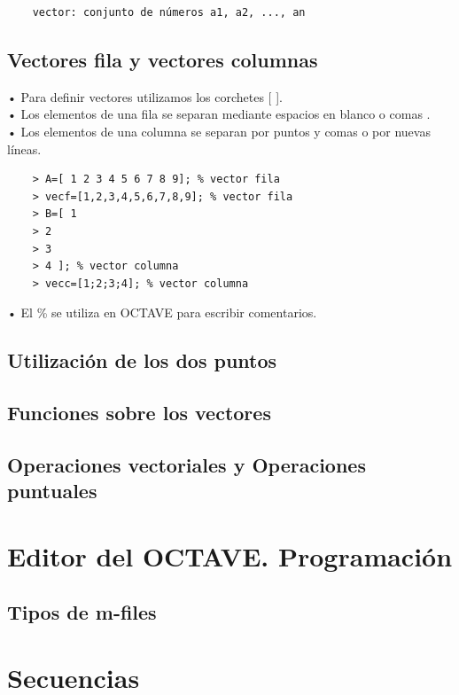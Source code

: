 \documentclass[a4,12pt]{article}
\begin{document}
\begin{verbatim}
    vector: conjunto de números a1, a2, ..., an
\end{verbatim}

\subsection{Vectores fila y vectores columnas}

• Para definir vectores utilizamos los corchetes [ ].\\
• Los elementos de una fila se separan mediante espacios en blanco o comas .\\
• Los elementos de una columna se separan por puntos y comas o por nuevas líneas.\\
\begin{verbatim}
    > A=[ 1 2 3 4 5 6 7 8 9]; % vector fila
    > vecf=[1,2,3,4,5,6,7,8,9]; % vector fila
    > B=[ 1
    > 2
    > 3
    > 4 ]; % vector columna
    > vecc=[1;2;3;4]; % vector columna
\end{verbatim}
• El \% se utiliza en OCTAVE para escribir comentarios.

\subsection{Utilización de los dos puntos}

\subsection{Funciones sobre los vectores}

\subsection{Operaciones vectoriales y Operaciones puntuales}

\section{Editor del OCTAVE. Programación}

\subsection{Tipos de m-files}

\section{Secuencias}
\end{document}
